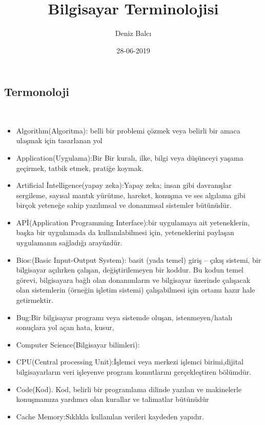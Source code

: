 \documentclass[10pt,a4paper,twoside]{article}
\title{Bilgisayar Terminolojisi}
\date{28-06-2019}
\author{Deniz Balcı}
\begin{document}
  \maketitle
  
  
  \begin{centering}
   \section{Termonoloji} \
\end{centering} 



\begin{itemize}

  \item Algorithm(Algoritma): belli bir problemi çözmek veya belirli bir amaca ulaşmak için tasarlanan yol
  \item Application(Uygulama):Bir  Bir kuralı, ilke, bilgi veya düşünceyi yaşama geçirmek, tatbik etmek, pratiğe koymak.
  \item Artificial İntelligence(yapay zeka):Yapay zeka; insan gibi davranışlar sergileme, sayısal mantık yürütme, hareket, konuşma ve ses algılama gibi birçok yeteneğe sahip yazılımsal ve donanımsal sistemler bütünüdür.
  \item APİ(Application Programming Interface):bir uygulamaya ait yeteneklerin, başka bir uygulamada da kullanılabilmesi için, yeteneklerini paylaşan uygulamanın sağladığı arayüzdür.
  \item Bios:(Basic Input-Output System): basit (yada temel) giriş – çıkış sistemi, bir bilgisayar açılırken çalışan, değiştirilemeyen bir koddur. Bu kodun temel görevi, bilgisayara bağlı olan donanımların ve bilgisayar üzerinde çalışacak olan sistemlerin (örneğin işletim sistemi) çalışabilmesi için ortamı hazır hale getirmektir.
  \item Bug:Bir bilgisayar programı veya sistemde oluşan, istenmeyen/hatalı sonuçlara yol açan hata, kusur,
  \item Computer Science(Bilgisayar bilimleri):
  \item CPU(Central processing Unit):İşlemci veya merkezi işlemci birimi,dijital bilgisayarların veri işleyenve program komutlarını gerçekleştiren bölümdür.
  \item Code(Kod). Kod, belirli bir programlama dilinde yazılan ve makinelerle konuşmamıza yardımcı olan kurallar ve talimatlar bütünüdür
  \item Cache Memory:Sıklıkla kullanılan verileri kaydeden yapıdır.

\end{itemize}
\end{document}
